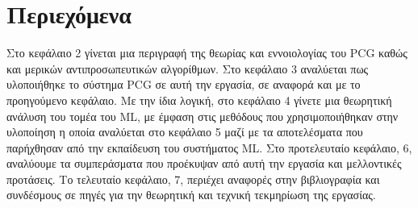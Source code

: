 \section{Περιεχόμενα}
Στο κεφάλαιο 2 γίνεται μια περιγραφή της θεωρίας και εννοιολογίας του PCG καθώς και μερικών αντιπροσωπευτικών αλγορίθμων. Στο κεφάλαιο 3 αναλύεται πως υλοποιήθηκε το σύστημα PCG σε αυτή την εργασία, σε αναφορά και με το προηγούμενο κεφάλαιο. Με την ίδια λογική, στο κεφάλαιο 4 γίνετε μια θεωρητική ανάλυση του τομέα του ML, με έμφαση στις μεθόδους που χρησιμοποιήθηκαν στην υλοποίηση η οποία αναλύεται στο κεφάλαιο 5 μαζί με τα αποτελέσματα που παρήχθησαν από την εκπαίδευση του συστήματος ML. Στο προτελευταίο κεφάλαιο, 6, αναλύουμε τα συμπεράσματα που προέκυψαν από αυτή την εργασία και μελλοντικές προτάσεις. Το τελευταίο κεφάλαιο, 7, περιέχει αναφορές στην βιβλιογραφία και συνδέσμους σε πηγές για την θεωρητική και τεχνική τεκμηρίωση της εργασίας.




